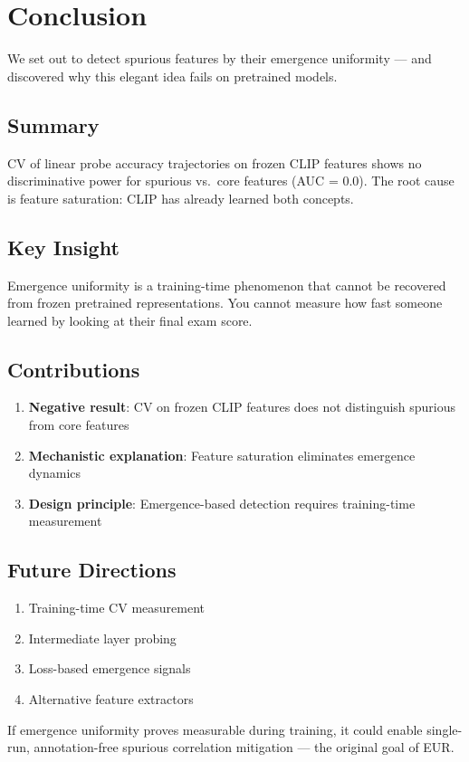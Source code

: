 \section{Conclusion}

We set out to detect spurious features by their emergence uniformity --- and discovered why this elegant idea fails on pretrained models.

\subsection{Summary}

CV of linear probe accuracy trajectories on frozen CLIP features shows no discriminative power for spurious vs.\ core features (AUC = 0.0). The root cause is feature saturation: CLIP has already learned both concepts.

\subsection{Key Insight}

Emergence uniformity is a training-time phenomenon that cannot be recovered from frozen pretrained representations. You cannot measure how fast someone learned by looking at their final exam score.

\subsection{Contributions}

\begin{enumerate}
    \item \textbf{Negative result}: CV on frozen CLIP features does not distinguish spurious from core features
    \item \textbf{Mechanistic explanation}: Feature saturation eliminates emergence dynamics
    \item \textbf{Design principle}: Emergence-based detection requires training-time measurement
\end{enumerate}

\subsection{Future Directions}

\begin{enumerate}
    \item Training-time CV measurement
    \item Intermediate layer probing
    \item Loss-based emergence signals
    \item Alternative feature extractors
\end{enumerate}

If emergence uniformity proves measurable during training, it could enable single-run, annotation-free spurious correlation mitigation --- the original goal of EUR.
